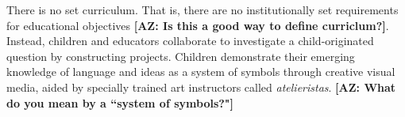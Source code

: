 There is no set curriculum. That is, there are no institutionally set requirements for educational objectives \textbf{[AZ: Is this a good way to define curriclum?]}. Instead, children and educators collaborate to investigate a child-originated question by constructing projects. Children demonstrate their emerging knowledge of language and ideas as a system of symbols through creative visual media, aided by specially trained art instructors called \textit{atelieristas}. \textbf{[AZ: What do you mean by a ``system of symbols?"]}
